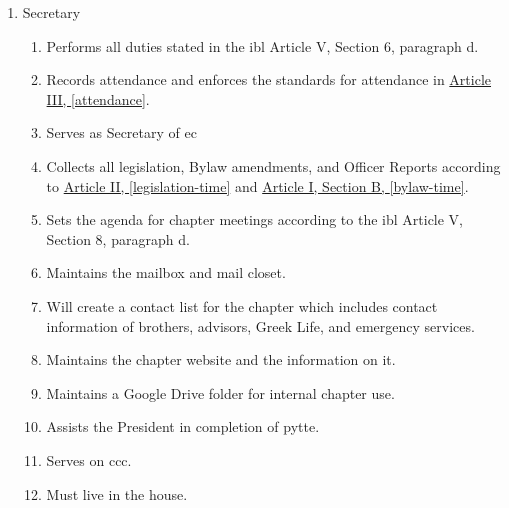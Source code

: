 \begin{enumerate}
		\item Secretary
			\begin{enumerate}
				\item Performs all duties stated in the \gls{ibl} Article V, Section 6, paragraph d.
				\item Records attendance and enforces the standards for attendance in \hyperref[attendance]{Article III, \autoref*{attendance}}.
				\item Serves as Secretary of \gls{ec} 
				\item Collects all legislation, Bylaw amendments, and Officer Reports according to \hyperref[legislation-time]{Article II, \autoref*{legislation-time}} and \hyperref[bylaw-time]{Article I, Section B, \autoref*{bylaw-time}}.
				\item Sets the agenda for chapter meetings according to the \gls{ibl} Article V, Section 8, paragraph d.
				\item Maintains the mailbox and mail closet.
				\item Will create a contact list for the chapter which includes contact information of brothers, advisors, Greek Life, and emergency services.
				\item Maintains the chapter website and the information on it.
				\item Maintains a Google Drive folder for internal chapter use.
				\item Assists the President in completion of \gls{pytte}.
				\item Serves on \gls{ccc}.
				\item Must live in the house.
			\end{enumerate}


\end{enumerate}

